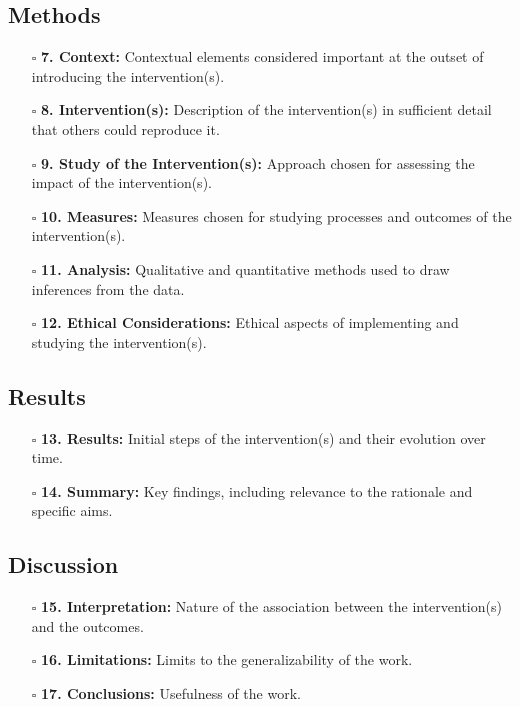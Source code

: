 \documentclass[11pt]{article}
\def\tightlist{}
\begin{document}
\begin{Form}
\subsection{Methods}\label{methods}

\begin{itemize}
\tightlist
\item[$\square$]
  \textbf{7. Context:} Contextual elements considered important at the
  outset of introducing the intervention(s).
\item[$\square$]
  \textbf{8. Intervention(s):} Description of the intervention(s) in
  sufficient detail that others could reproduce it.
\item[$\square$]
  \textbf{9. Study of the Intervention(s):} Approach chosen for
  assessing the impact of the intervention(s).
\item[$\square$]
  \textbf{10. Measures:} Measures chosen for studying processes and
  outcomes of the intervention(s).
\item[$\square$]
  \textbf{11. Analysis:} Qualitative and quantitative methods used to
  draw inferences from the data.
\item[$\square$]
  \textbf{12. Ethical Considerations:} Ethical aspects of implementing
  and studying the intervention(s).
\end{itemize}

\subsection{Results}\label{results}

\begin{itemize}
\tightlist
\item[$\square$]
  \textbf{13. Results:} Initial steps of the intervention(s) and their
  evolution over time.
\item[$\square$]
  \textbf{14. Summary:} Key findings, including relevance to the
  rationale and specific aims.
\end{itemize}

\subsection{Discussion}\label{discussion}

\begin{itemize}
\tightlist
\item[$\square$]
  \textbf{15. Interpretation:} Nature of the association between the
  intervention(s) and the outcomes.
\item[$\square$]
  \textbf{16. Limitations:} Limits to the generalizability of the work.
\item[$\square$]
  \textbf{17. Conclusions:} Usefulness of the work.
\end{itemize}


\end{Form}
\end{document}
